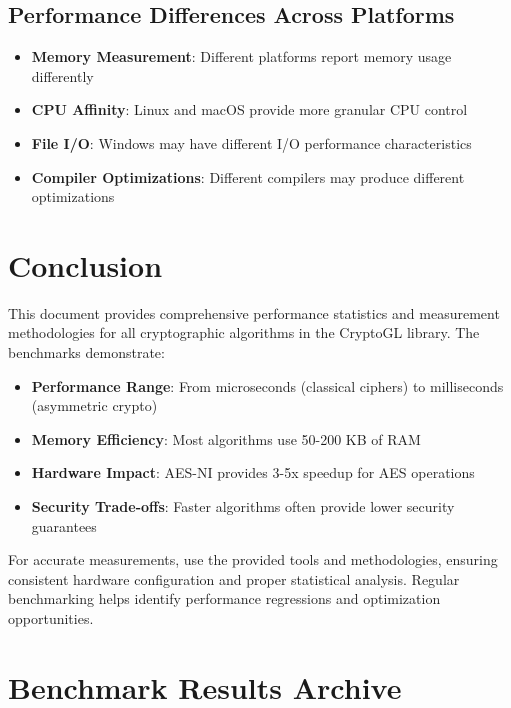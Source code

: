 \documentclass[12pt,a4paper]{article}
\begin{document}
\subsection{Performance Differences Across Platforms}

\begin{itemize}
    \item \textbf{Memory Measurement}: Different platforms report memory usage differently
    \item \textbf{CPU Affinity}: Linux and macOS provide more granular CPU control
    \item \textbf{File I/O}: Windows may have different I/O performance characteristics
    \item \textbf{Compiler Optimizations}: Different compilers may produce different optimizations
\end{itemize}

\section{Conclusion}

This document provides comprehensive performance statistics and measurement methodologies for all cryptographic algorithms in the CryptoGL library. The benchmarks demonstrate:

\begin{itemize}
    \item \textbf{Performance Range}: From microseconds (classical ciphers) to milliseconds (asymmetric crypto)
    \item \textbf{Memory Efficiency}: Most algorithms use 50-200 KB of RAM
    \item \textbf{Hardware Impact}: AES-NI provides 3-5x speedup for AES operations
    \item \textbf{Security Trade-offs}: Faster algorithms often provide lower security guarantees
\end{itemize}

For accurate measurements, use the provided tools and methodologies, ensuring consistent hardware configuration and proper statistical analysis. Regular benchmarking helps identify performance regressions and optimization opportunities.

\appendix

\section{Benchmark Results Archive}
\end{document}
